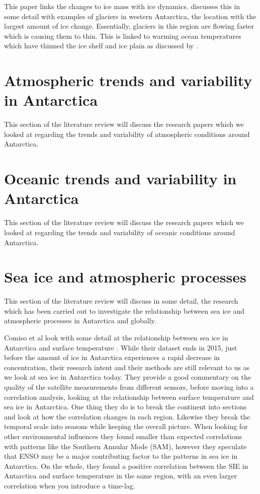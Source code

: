 \documentclass[../main.tex]{subfiles}
\begin{document}
This paper links the changes to ice mass with ice dynamics. \cite{Flament2020DynamicAltimetry} discusses this in some detail with examples of glaciers in western Antarctica, the location with the largest amount of ice change. Essentially, glaciers in this region are flowing faster which is causing them to thin. This is linked to warming ocean temperatures which have thinned the ice shelf and ice plain as discussed by \cite{Corr2020InvestigationsAntarctica}.


\section{Atmospheric trends and variability in Antarctica}
This section of the literature review will discuss the research papers which we looked at regarding the trends and variability of atmospheric conditions around Antarctica.


\section{Oceanic trends and variability in Antarctica}
This section of the literature review will discuss the research papers which we looked at regarding the trends and variability of oceanic conditions around Antarctica.

\section{Sea ice and atmospheric processes}
This section of the literature review will discuss in some detail, the research which has been carried out to investigate the relationship between sea ice and atmospheric processes in Antarctica and globally.

Comiso et al look with some detail at the relationship between sea ice in Antarctica and surface temperature \cite{Comiso}. While their dataset ends in 2015, just before the amount of ice in Antarctica experiences a rapid decrease in concentration, their research intent and their methods are still relevant to us as we look at sea ice in Antarctica today. They provide a good commentary on the quality of the satellite measurements from different sensors, before moving into a correlation analysis, looking at the relationship between surface temperature and sea ice in Antarctica. One thing they do is to break the continent into sections and look at how the correlation changes in each region. Likewise they break the temporal scale into seasons while keeping the overall picture. When looking for other environmental influences they found smaller than expected correlations with patterns like the Southern Annular Mode (SAM), however they speculate that ENSO may be a major contributing factor to the patterns in sea ice in Antarctica. On the whole, they found a positive correlation between the SIE in Antarctica and surface temperature in the same region, with an even larger correlation when you introduce a time-lag. 
\end{document}
